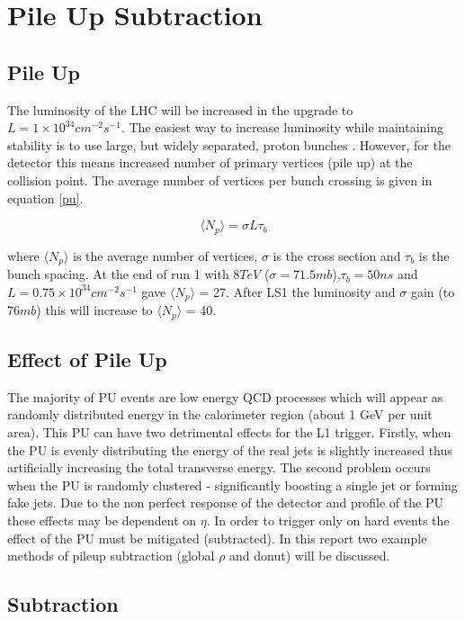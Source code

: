 \section{Pile Up Subtraction}
\subsection{Pile Up}
The luminosity of the LHC will be increased in the upgrade to $L = 1\times10^{34} cm^{-2}s^{-1}$. The easiest way to increase luminosity while maintaining stability is to use large, but widely separated, proton bunches \cite{pileup}. However, for the detector this means increased number of primary vertices (pile up) at the collision point. The average number of vertices per bunch crossing is given in equation \ref{pu}.

\begin{equation}
\langle N_p \rangle = \sigma L \tau_b
\label{pu}
\end{equation}

where $\langle N_p \rangle$ is the average number of vertices, $\sigma$ is the cross section and $\tau_b$ is the bunch spacing. At the end of run 1 with $8 TeV$ ($\sigma = 71.5mb$),$\tau_b = 50ns$ and $L = 0.75\times10^{34} cm^{-2}s^{-1}$ gave $\langle N_p \rangle$ = 27. After LS1 the luminosity and $\sigma$ gain (to $76mb$) this will increase to $\langle N_p \rangle$ = 40. 
\subsection{Effect of Pile Up}
The majority of PU events are low energy QCD processes which will appear as randomly distributed energy in the calorimeter region (about 1 GeV per unit area). This PU can have two detrimental effects for the L1 trigger. Firstly, when the PU is evenly distributing the energy of the real jets is slightly increased thus artificially increasing the total transverse energy. The second problem occurs when the PU is randomly clustered - significantly boosting a single jet or forming fake jets. Due to the non perfect response of the detector and profile of the PU these effects may be dependent on $\eta$. In order to trigger only on hard events the effect of the PU must be mitigated (subtracted). In this report two example methods of pileup subtraction (global $\rho$ and donut) will be discussed.
\subsection{Subtraction}

